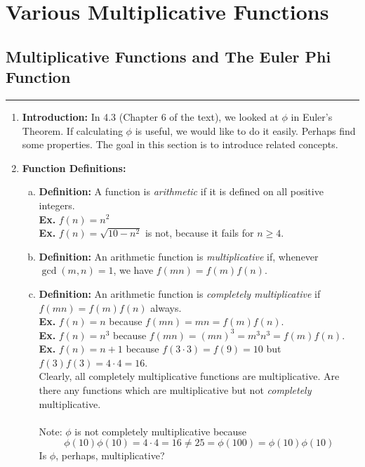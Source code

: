 \documentclass[class=article, crop=false]{standalone}
\begin{document}
    
\section{Various Multiplicative Functions}

\subsection{Multiplicative Functions and The Euler Phi Function}
\rule{\textwidth}{1pt}
\begin{enumerate}
\item \textbf{Introduction:}
In 4.3 (Chapter 6 of the text), we looked at $\phi$ in Euler's Theorem.
If calculating $\phi$ is useful, we would like to do it easily. Perhaps
find some properties. The goal in this section is to introduce related concepts.

\item \textbf{Function Definitions:}
\begin{enumerate}[(a)]
	\item \textbf{Definition:}
	A function is \emph{arithmetic} if it is defined on all positive integers.\\
	\textbf{Ex.} $f(n) = n^2$\\
	\textbf{Ex.} $f(n) = \sqrt{10-n^2}$ is not, because it fails for $n\geq 4$.

	\item \textbf{Definition:}
	An arithmetic function is \emph{multiplicative} if, whenever $\gcd(m,n)=1$,
	we have $f(mn)= f(m)f(n)$.

	\item \textbf{Definition:}
	An arithmetic function is \emph{completely multiplicative} if
	$f(mn) = f(m)f(n)$ always. \\
	\textbf{Ex.} $f(n)=n$ because $f(mn) = mn = f(m)f(n)$. \\
	\textbf{Ex.} $f(n)=n^3$ because $f(mn) = (mn)^3 = m^3 n^3 = f(m) f(n)$. \\
	\textbf{Ex.} $f(n)=n+1$ because $f(3\cdot 3)=f(9)=10$ but $f(3)f(3)=4\cdot4=16$. \\
	Clearly, all completely multiplicative functions are multiplicative. Are there any functions which are
	multiplicative but not \emph{completely} multiplicative.\\\\
	Note: $\phi$ is not completely multiplicative because 
	$$\phi(10)\phi(10)=4\cdot 4= 16\neq 25=\phi(100) = \phi(10)\phi(10)$$
	Is $\phi$, perhaps, multiplicative?
	

\end{enumerate}
\end{enumerate}
\end{document}
